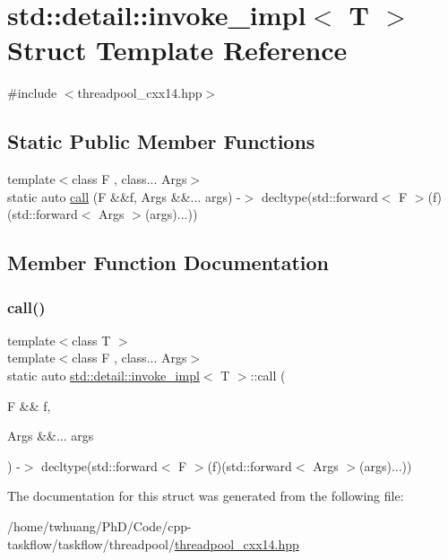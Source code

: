 \hypertarget{structstd_1_1detail_1_1invoke__impl}{}\section{std\+:\+:detail\+:\+:invoke\+\_\+impl$<$ T $>$ Struct Template Reference}
\label{structstd_1_1detail_1_1invoke__impl}


{\ttfamily \#include $<$threadpool\+\_\+cxx14.\+hpp$>$}

\subsection*{Static Public Member Functions}
\begin{DoxyCompactItemize}
\item 
{\footnotesize template$<$class F , class... Args$>$ }\\static auto \hyperlink{structstd_1_1detail_1_1invoke__impl_abc57075dcca67e9a80242eb4f14611cb}{call} (F \&\&f, Args \&\&... args) -\/$>$ decltype(std\+::forward$<$ F $>$(f)(std\+::forward$<$ Args $>$(args)...))
\end{DoxyCompactItemize}


\subsection{Member Function Documentation}
\mbox{\label{structstd_1_1detail_1_1invoke__impl_abc57075dcca67e9a80242eb4f14611cb}} 
\subsubsection{\texorpdfstring{call()}{call()}}
{\footnotesize\ttfamily template$<$class T $>$ \\
template$<$class F , class... Args$>$ \\
static auto \hyperlink{structstd_1_1detail_1_1invoke__impl}{std\+::detail\+::invoke\+\_\+impl}$<$ T $>$\+::call (\begin{DoxyParamCaption}\item[{F \&\&}]{f,  }\item[{Args \&\&...}]{args }\end{DoxyParamCaption}) -\/$>$  decltype(std\+::forward$<$ F $>$(f)(std\+::forward$<$ Args $>$(args)...))\hspace{0.3cm}{\ttfamily [static]}}



The documentation for this struct was generated from the following file\+:\begin{DoxyCompactItemize}
\item 
/home/twhuang/\+Ph\+D/\+Code/cpp-\/taskflow/taskflow/threadpool/\hyperlink{threadpool__cxx14_8hpp}{threadpool\+\_\+cxx14.\+hpp}\end{DoxyCompactItemize}
